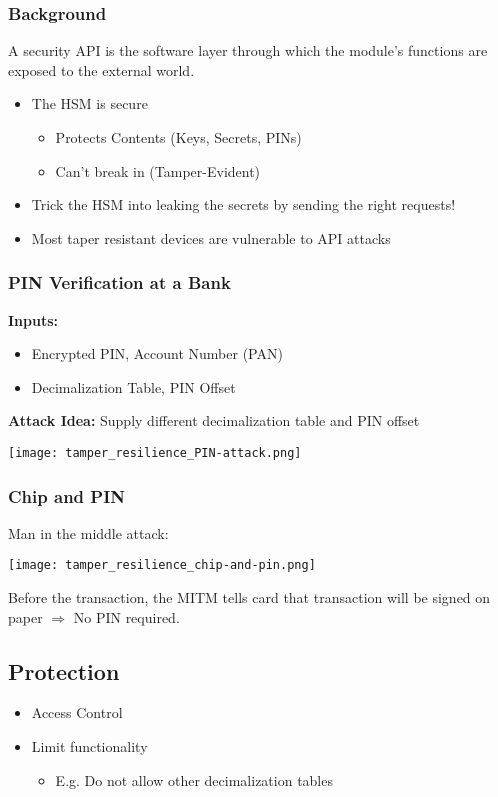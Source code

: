 \subsubsection{Background}
A security API is the software layer through which the module's functions are
exposed to the external world.
\begin{itemize}
  \item The HSM is secure
    \begin{itemize}
      \item Protects Contents (Keys, Secrets, PINs)
      \item Can’t break in (Tamper-Evident)
    \end{itemize}
  \item Trick the HSM into leaking the secrets by
    sending the right requests!
  \item Most taper resistant devices are vulnerable to API attacks
\end{itemize}

\subsubsection{PIN Verification at a Bank}
\textbf{Inputs:}

\begin{itemize}
  \item Encrypted PIN, Account Number (PAN)
  \item Decimalization Table, PIN Offset
\end{itemize}
\textbf{Attack Idea:} Supply different decimalization table and PIN offset
\begin{center}
  \texttt{[image: tamper\_resilience\_PIN-attack.png]}
\end{center}

\subsubsection{Chip and PIN}
Man in the middle attack:
\begin{center}
  \texttt{[image: tamper\_resilience\_chip-and-pin.png]}
\end{center}
Before the transaction, the MITM tells card that transaction will be signed on
paper $\Rightarrow$ No PIN required.

\subsection{Protection}
\begin{itemize}
  \item Access Control
  \item Limit functionality
    \begin{itemize}
      \item E.g. Do not allow other decimalization tables
    \end{itemize}

\end{itemize}

